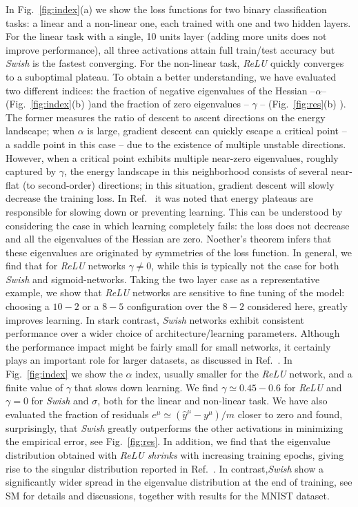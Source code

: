 \documentclass[5p]{elsarticle}
\begin{document}
In Fig.~\eqref{fig:index}(a) we show the loss functions for two binary classification tasks: a linear and a non-linear one, each trained with one and two hidden layers. For the linear task with a single, 10 units layer (adding more units does not improve performance), all three activations attain full train/test accuracy but {\it Swish} is the fastest converging.  For the non-linear task, {\it ReLU} quickly converges to a suboptimal plateau. To obtain a better understanding, we have evaluated two different indices: the fraction of negative eigenvalues of the Hessian --$\alpha$--(Fig.~\ref{fig:index}(b) )and the fraction of zero eigenvalues -- $\gamma$ --  (Fig.~\ref{fig:res}(b) ). The former measures the ratio of descent to ascent directions on the energy landscape; when $\alpha$ is large, gradient descent can quickly escape a critical point -- a saddle point in this case --  due to the existence of multiple unstable directions. However, when a critical point exhibits multiple near-zero eigenvalues, roughly captured by $\gamma$, the energy landscape in this neighborhood consists of several near-flat (to second-order) directions; in this situation, gradient descent will slowly decrease the training loss. In Ref.~\cite{dauphin} it was noted that energy plateaus are responsible for slowing down or preventing learning. This can be understood by considering the case in which learning completely fails: the loss does not decrease and all the eigenvalues of the Hessian are zero. Noether's theorem infers that these eigenvalues are originated by symmetries of the loss function. %
In general, we find that  for {\it ReLU} networks $\gamma \neq 0$, while this is typically not the case for both {\it Swish} and sigmoid-networks. Taking the two layer case as a representative example, we show that {\it ReLU} networks are sensitive to fine tuning of the model: choosing a $10-2$ or a $8-5$ configuration over the $8-2$ considered here, greatly improves learning. In stark contrast, {\it Swish} networks exhibit consistent performance over a wider choice of architecture/learning parameters. Although the performance impact might be fairly small for small networks, it certainly plays an important role for larger datasets, as discussed in Ref.~\cite{prajit}.
In Fig.~\eqref{fig:index} we show the $\alpha$ index, usually smaller for the {\it ReLU} network, and a finite value of $\gamma$ that slows down learning. We find $\gamma \simeq 0.45-0.6$ for {\it ReLU} and $\gamma=0$ for {\it Swish} and $\sigma$, both for the linear and non-linear task. We have also evaluated the fraction of residuals $e^{\mu} \simeq (\hat{y}^{\mu} - y^{\mu})/m$ closer to zero and found, surprisingly, that {\it Swish} greatly outperforms the other activations in minimizing the empirical error, see Fig.~\eqref{fig:res}.
%
 In addition, we find that the eigenvalue distribution obtained with {\it ReLU}  {\it shrinks} with increasing training epochs, giving rise to the singular distribution reported in Ref.~\cite{penn1, levent}. In contrast,{\it Swish} show a significantly wider spread in the eigenvalue distribution at the end of training, see SM for details and discussions, together with results for the MNIST dataset.
\end{document}
